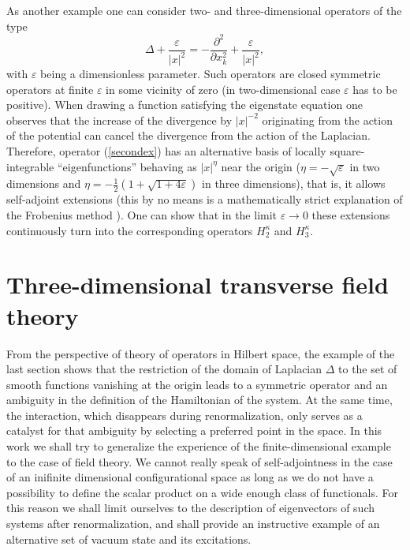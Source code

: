\documentclass[12pt]{article}
\newcommand{\ve}{\varepsilon}
\begin{document}
	As another example one can consider two- and three-dimensional
    operators of the type
\begin{equation}
\label{secondex}
    \Delta + \frac{\ve}{|x|^{2}} =
	-\frac{\partial^{2}}{\partial x_{k}^{2}} + \frac{\ve}{|x|^{2}},
\end{equation}
	with
$ \ve $ being a dimensionless parameter.
	Such operators are closed symmetric operators at finite
$ \ve $
	in some vicinity of zero (in two-dimensional case
$ \ve $ has to be positive).
	When drawing a function satisfying the eigenstate equation
	one observes that the increase of the divergence by
$ |x|^{-2} $
	originating from the action of the potential can cancel the
	divergence from the action of the Laplacian.
	Therefore, operator
(\ref{secondex})
	has an alternative basis of locally square-integrable
	``eigenfunctions'' behaving as
$ |x|^{\eta} $
	near the origin
($ \eta = -\sqrt{\ve} $ in two dimensions and
$ \eta = -\frac{1}{2}(1+\sqrt{1+4\ve}) $ in three dimensions),
	that is, it allows self-adjoint extensions
	(this by no means is a mathematically strict explanation
    of the Frobenius method
\cite{Frobenius}).
	One can show that in the limit
$ \ve \to 0 $
	these extensions continuously turn into the corresponding operators
$ H_{2}^{\kappa} $ and
$ H_{3}^{\kappa} $.




\section{Three-dimensional transverse field theory}
	From the perspective of theory of operators in Hilbert space,
	the example of the last section shows that the restriction of the
	domain of Laplacian
$ \Delta $
	to the set of smooth functions vanishing at the origin
	leads to a symmetric operator and an ambiguity in the definition
	of the Hamiltonian of the system.
    At the same time, the interaction, which disappears during
    renormalization,
    only serves as a catalyst for that ambiguity by selecting a preferred
    point in the space.
    In this work we shall try to generalize the experience of the
    finite-dimensional example to the case of field theory.
    We cannot really speak of self-adjointness
    in the case of an inifinite dimensional configurational space
    as long as we do not have a possibility to define the scalar product
    on a wide enough class of functionals.
    For this reason we shall limit ourselves to the description
    of eigenvectors of such systems after renormalization,
    and shall provide an instructive example of an alternative set
    of vacuum state and its excitations.
\end{document}

